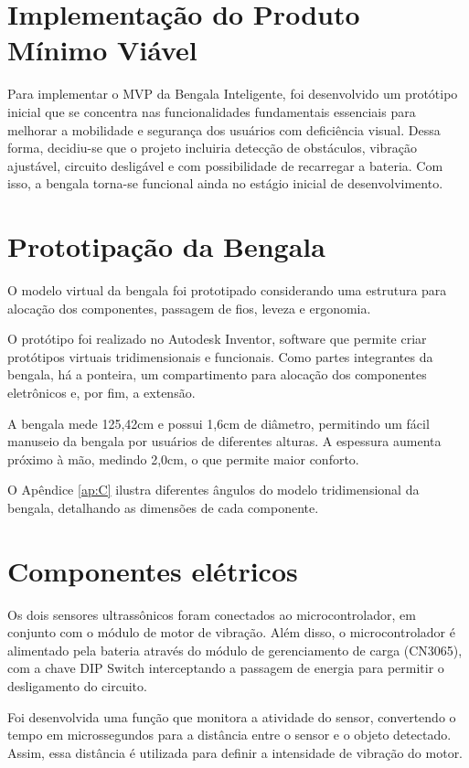 \section{Implementação do Produto Mínimo Viável}
Para implementar o MVP da Bengala Inteligente, foi desenvolvido um protótipo inicial que se concentra nas funcionalidades fundamentais essenciais para melhorar a mobilidade e segurança dos usuários com deficiência visual. Dessa forma, decidiu-se que o projeto incluiria detecção de obstáculos, vibração ajustável, circuito desligável e com possibilidade de recarregar a bateria. Com isso, a bengala torna-se funcional ainda no estágio inicial de desenvolvimento.

\section{Prototipação da Bengala}
O modelo virtual da bengala foi prototipado considerando uma estrutura para alocação dos componentes, passagem de fios, leveza e ergonomia.

O protótipo foi realizado no Autodesk Inventor, software que permite criar protótipos virtuais tridimensionais e funcionais. Como partes integrantes da bengala, há a ponteira, um compartimento para alocação dos componentes eletrônicos e, por fim, a extensão.

A bengala mede 125,42cm e possui 1,6cm de diâmetro, permitindo um fácil manuseio da bengala por usuários de diferentes alturas. A espessura aumenta próximo à mão, medindo 2,0cm, o que permite maior conforto.

O Apêndice \ref{ap:C} ilustra diferentes ângulos do modelo tridimensional da bengala, detalhando as dimensões de cada componente.

\section{Componentes elétricos}
Os dois sensores ultrassônicos foram conectados ao microcontrolador, em conjunto com o módulo de motor de vibração. Além disso, o microcontrolador é alimentado pela bateria através do módulo de gerenciamento de carga (CN3065), com a chave DIP Switch interceptando a passagem de energia para permitir o desligamento do circuito. 

Foi desenvolvida uma função que monitora a atividade do sensor, convertendo o tempo em microssegundos para a distância entre o sensor e o objeto detectado. Assim, essa distância é utilizada para definir a intensidade de vibração do motor.

